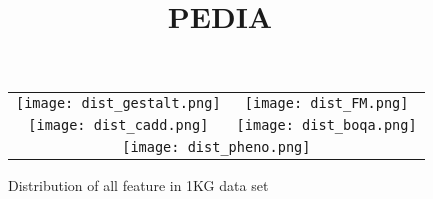 \documentclass[12pt,cspaper]{paper}
\begin{document}
\title{PEDIA}

\maketitle










\begin{figure}[ht]
  \begin{center}
    \graphicspath{{../output/distribution/CV_1KG/}}
    \begin{tabular}{cc}
      \texttt{[image: dist\_gestalt.png]}&
      \texttt{[image: dist\_FM.png]}\\
      \texttt{[image: dist\_cadd.png]}&
      \texttt{[image: dist\_boqa.png]}\\
      \multicolumn{2}{c}{\texttt{[image: dist\_pheno.png]}}\\
    \end{tabular}
  \caption{Distribution of all feature in 1KG data set}
  \end{center}
\end{figure}

%


%
%

\vfill
\end{document}
